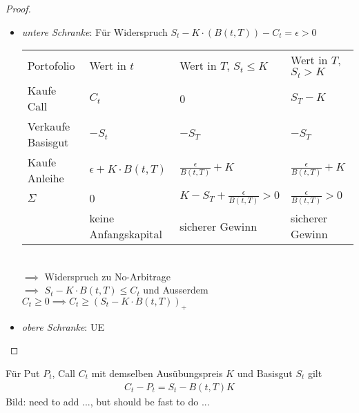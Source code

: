 \begin{proof}
	\begin{itemize}
		\item \emph{untere Schranke}: Für Widerspruch $S_t - K\cdot(B(t,T))-C_t = \epsilon > 0$\\
		\begin{tabular}{l|l|l|l} %
			Portofolio & Wert in $t$ & Wert in $T$, $S_t \le K$ & Wert in $T$, $S_t > K$\\
			Kaufe Call & $C_t$ & 0 & $S_T - K$\\
			Verkaufe Basisgut & $-S_t$ & $-S_T$ & $-S_T$\\
			Kaufe Anleihe & $\epsilon + K\cdot B(t,T)$ & $\frac{\epsilon}{B(t,T)}+K$ & $\frac{\epsilon}{B(t,T)} + K$\\
			$\Sigma$ & 0 & $K - S_T + \frac{\epsilon}{B(t,T)} > 0$ & $\frac{\epsilon}{B(t,T)} > 0$\\
			& keine Anfangskapital & sicherer Gewinn & sicherer Gewinn\\
		\end{tabular}\\
		$\implies$ Widerspruch zu No-Arbitrage\\
		$\implies$ $S_t - K\cdot B(t,T) \le C_t$ und Ausserdem $C_t \ge 0 \implies C_t \ge (S_t - K\cdot B(t,T))_+$
		\item \emph{obere Schranke}: UE
	\end{itemize}
\end{proof}
\begin{lemma} %
	Für Put $P_t$, Call $C_t$ mit demselben Ausübungspreis $K$ und Basisgut $S_t$ gilt
	\begin{align*}
	C_t - P_t = S_t - B(t,T)K
	\end{align*}
	Bild: need to add ..., but should be fast to do ...
\end{lemma}
